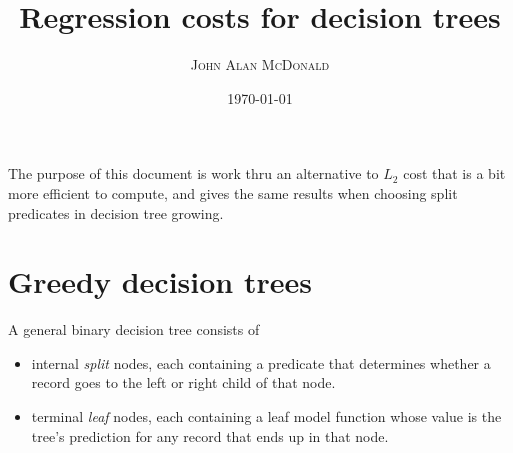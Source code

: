 



\title{Regression costs for decision trees}
\author{\textsc{John Alan McDonald }}
\date{\today}

\maketitle

The purpose of this document is work thru an alternative to $L_2$
cost that is a bit more efficient to compute, and gives the same
results when choosing split predicates in decision tree growing.

\section{\label{sub:Decision-trees}Greedy decision trees}

A general binary decision tree consists of
\begin{itemize}
\item internal \emph{split} nodes, each containing a predicate 
that determines
whether a record goes to the left or right child of that node.
\item terminal \emph{leaf} nodes, each containing a leaf model
 function whose value is the tree's prediction for any record 
 that ends up in that node. 
\end{itemize}

